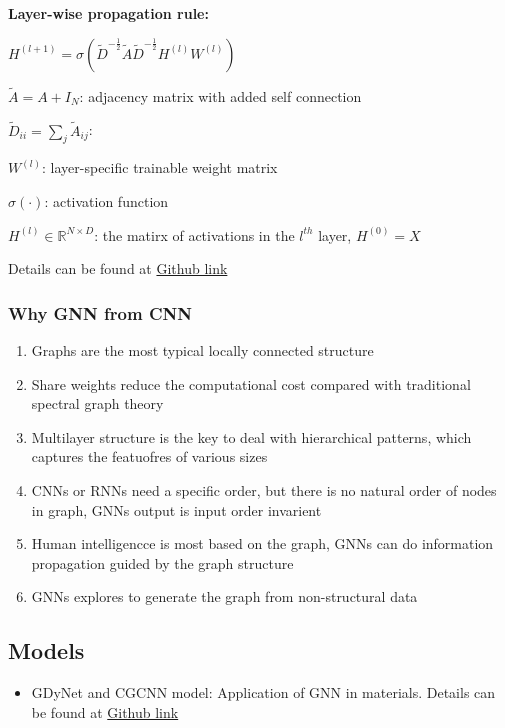 \documentclass[]{article}
\begin{document}
\textbf{Layer-wise propagation rule:}

\(H^{(l+1)} = \sigma( \widetilde{D}^{-\frac{1}{2}} \widetilde{A} \widetilde{D}^{-\frac{1}{2}} H^{(l)} W^{(l)})\)

\(\widetilde{A} = A + I_N\): adjacency matrix with added self connection

\(\widetilde{D}_{ii} = \sum_j \widetilde{A}_{ij}\):

\(W^{(l)}\): layer-specific trainable weight matrix

\(\sigma(\cdot)\): activation function

\(H^{(l)} \in \mathbb{R}^{N \times D}\): the matirx of activations in
the \(l^{th}\) layer, \(H^{(0)} = X\)

Details can be found at
\href{https://github.com/OrdinaryCrazy/cnn-compiler-notebook/blob/master/Studying\%20Note/GCN.md}{Github
link}

\hypertarget{header-n1807}{%
\subsubsection{Why GNN from CNN}\label{header-n1807}}

\begin{enumerate}
\def\labelenumi{\arabic{enumi}.}
\item
  Graphs are the most typical locally connected structure
\item
  Share weights reduce the computational cost compared with traditional
  spectral graph theory
\item
  Multilayer structure is the key to deal with hierarchical patterns,
  which captures the featuofres of various sizes
\item
  CNNs or RNNs need a specific order, but there is no natural order of
  nodes in graph, GNNs output is input order invarient
\item
  Human intelligencce is most based on the graph, GNNs can do
  information propagation guided by the graph structure
\item
  GNNs explores to generate the graph from non-structural data
\end{enumerate}

\hypertarget{header-n1821}{%
\subsection{Models}\label{header-n1821}}

\begin{itemize}
\item
  GDyNet and CGCNN model: Application of GNN in materials. Details can
  be found at
  \href{https://github.com/OrdinaryCrazy/cnn-compiler-notebook/blob/master/weekly-report/weeklyreport0722-0728.pdf}{Github
  link}
\end{itemize}
\end{document}
